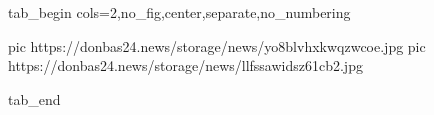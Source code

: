  
 
 
 
 


\ifcmt
  tab_begin cols=2,no_fig,center,separate,no_numbering

     pic https://donbas24.news/storage/news/yo8blvhxkwqzwcoe.jpg
		 pic https://donbas24.news/storage/news/llfssawidsz61cb2.jpg

  tab_end
\fi
